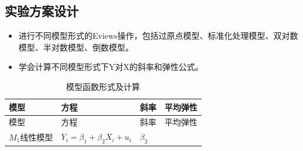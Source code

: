 \documentclass[12pt,(landscape,a4paper),(portrait,a4paper)]{article}
\begin{document}
\subsection{实验方案设计}

\begin{itemize}
\item
  进行不同模型形式的Eviews操作，包括过原点模型、标准化处理模型、双对数模型、半对数模型、倒数模型。
\item
  学会计算不同模型形式下Y对X的斜率和弹性公式。
\end{itemize}

\begin{longtable}[]{@{}llll@{}}
\caption{模型函数形式及计算 \label{modelslc}}\tabularnewline
\toprule
\begin{minipage}[b]{0.18\columnwidth}\raggedright
模型\strut
\end{minipage} & \begin{minipage}[b]{0.31\columnwidth}\raggedright
方程\strut
\end{minipage} & \begin{minipage}[b]{0.17\columnwidth}\raggedright
斜率\strut
\end{minipage} & \begin{minipage}[b]{0.22\columnwidth}\raggedright
平均弹性\strut
\end{minipage}\tabularnewline
\midrule
\endfirsthead
\toprule
\begin{minipage}[b]{0.18\columnwidth}\raggedright
模型\strut
\end{minipage} & \begin{minipage}[b]{0.31\columnwidth}\raggedright
方程\strut
\end{minipage} & \begin{minipage}[b]{0.17\columnwidth}\raggedright
斜率\strut
\end{minipage} & \begin{minipage}[b]{0.22\columnwidth}\raggedright
平均弹性\strut
\end{minipage}\tabularnewline
\midrule
\endhead
\begin{minipage}[t]{0.18\columnwidth}\raggedright
\(M_1\)线性模型\strut
\end{minipage} & \begin{minipage}[t]{0.31\columnwidth}\raggedright
\(Y_i=\beta_1+\beta_2X_i+u_i\)\strut
\end{minipage} & \begin{minipage}[t]{0.17\columnwidth}\raggedright
\(\beta_2\)\strut
\end{minipage} & \begin{minipage}[t]{0.22\columnwidth}\raggedright

\end{minipage}
\end{longtable}
\end{document}
